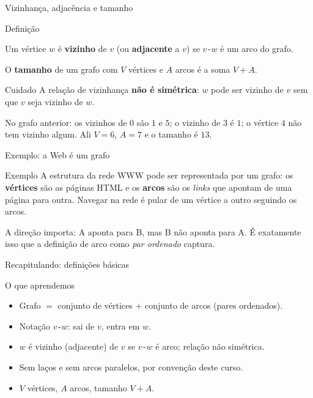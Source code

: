\documentclass[aspectratio=169]{beamer}
\begin{document}
\begin{frame}{Vizinhança, adjacência e tamanho}
  \begin{block}{Definição}
    {\small Um vértice $w$ é \textbf{vizinho} de $v$ (ou \textbf{adjacente} a $v$)
    se $v$\texttt{-}$w$ é um arco do grafo.

    O \textbf{tamanho} de um grafo com $V$ vértices e $A$ arcos é a soma $V+A$.}
  \end{block}
  \begin{alertblock}{Cuidado}
    {\small A relação de vizinhança \textbf{não é simétrica}: $w$ pode ser
    vizinho de $v$ sem que $v$ seja vizinho de $w$.}
  \end{alertblock}
  {\small No grafo anterior: os vizinhos de $0$ são $1$ e $5$; o vizinho de $3$ é $1$;
  o vértice $4$ não tem vizinho algum. Ali $V=6$, $A=7$ e o tamanho é $13$.}
\end{frame}

\begin{frame}{Exemplo: a Web é um grafo}
  \begin{exampleblock}{Exemplo}
    {\small A estrutura da rede WWW pode ser representada por um grafo: os
    \textbf{vértices} são as páginas HTML e os \textbf{arcos} são os \emph{links}
    que apontam de uma página para outra. Navegar na rede é pular de um vértice
    a outro seguindo os arcos.}
  \end{exampleblock}
  \begin{center}
  \end{center}
  {\scriptsize A direção importa: A aponta para B, mas B não aponta para A.
  É exatamente isso que a definição de arco como \emph{par ordenado} captura.}
\end{frame}

\begin{frame}{Recapitulando: definições básicas}
  \begin{block}{O que aprendemos}
    \begin{itemize}\small
      \item Grafo $=$ conjunto de vértices $+$ conjunto de arcos (pares ordenados).
      \item Notação $v$\texttt{-}$w$: sai de $v$, entra em $w$.
      \item $w$ é vizinho (adjacente) de $v$ se $v$\texttt{-}$w$ é arco; relação não simétrica.
      \item Sem laços e sem arcos paralelos, por convenção deste curso.
      \item $V$ vértices, $A$ arcos, tamanho $V+A$.
    \end{itemize}
  \end{block}
\end{frame}
\end{document}
